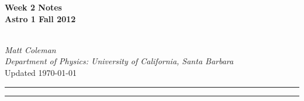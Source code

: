 \documentclass{article}
\begin{document}
\cfoot{\thepage}

\begin{centering}
	
	\begin{large}\textbf{Week 2 Notes\\
	Astro 1 Fall 2012}\end{large}\vspace{7pt}\\
	\textit{Matt Coleman \\
	Department of Physics: University of California, Santa Barbara}\vspace{5pt}\\
	Updated \today\vspace{14pt}
	
\end{centering}	

\hrule\vspace{2pt} \hrule


\end{document}
